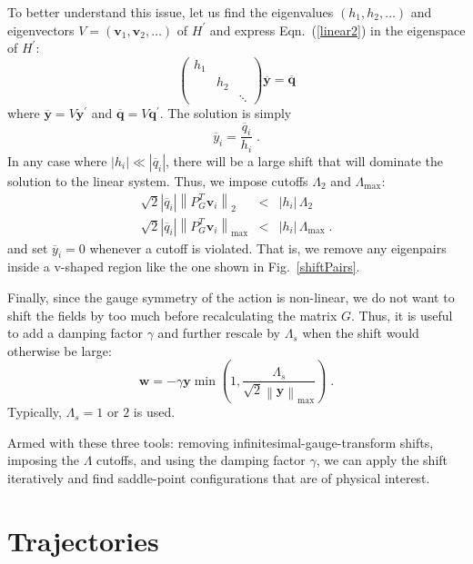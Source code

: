 \documentclass[preprint,aps,prd]{revtex4-2}
\newcommand{\be}{\begin{equation}}
\newcommand{\eq}{\end{equation}}
\newcommand{\heigen}{h}
\begin{document}
To better understand this issue, let us find the eigenvalues
$\left(\heigen_1, \heigen_2, \ldots\right)$ and
eigenvectors $V=\left(\mathbf{v}_1, \mathbf{v}_2, \ldots\right)$
of $H^\prime$ and express Eqn.~(\ref{linear2}) in the eigenspace of $H^\prime$:
\be
\begin{pmatrix}
    \heigen_1 & & \\
    & \heigen_2 & \\
    & & \ddots  \end{pmatrix} \overline{\mathbf{y}} =
  \overline{\mathbf{q}} \label{linear3}
\eq
where $\overline{\mathbf{y}} = V \mathbf{y}^\prime$ and
$\overline{\mathbf{q}}  = V \mathbf{q}^\prime$.
The solution is simply
\be
    \overline{y}_i = \frac{\overline{q}_i}{\heigen_i} \; .
\eq
In any case where $\left|\heigen_i\right|\ll
\left|\overline{q}_i\right|$,
there will be a large shift that will dominate the solution
to the linear system.
Thus, we impose cutoffs $\Lambda_2$ and $\Lambda_\mathrm{max}$:
\begin{eqnarray}
    \sqrt{2} \left|\overline{q}_i\right|\left\lVert P_G^T \mathbf{v}_i\right\rVert_2
     &<& \left|\heigen_i\right|\,\Lambda_2 \label{lambda2} \\
    \sqrt{2} \left|\overline{q}_i\right|
      \left\lVert P_G^T \mathbf{v}_i\right\rVert_\mathrm{max}
    &<& \left|\heigen_i\right|\,\Lambda_\mathrm{max} \; .
\end{eqnarray}
%
and set $\overline{y}_i=0$ whenever a cutoff is violated.
That is, we remove any eigenpairs inside a v-shaped
region like the one shown in Fig.~\ref{shiftPairs}.  

Finally, since the gauge symmetry of the action is non-linear,
we do not want to shift the fields by too much before recalculating
the matrix $G$.  
Thus, it is useful to add a damping factor $\gamma$ and
further rescale by $\Lambda_s$ when the shift would
otherwise be large:
\be
  \mathbf{w} = - \gamma \mathbf{y} \min\left(1, \frac{\Lambda_s}{
    \sqrt{2} \left\lVert \mathbf{y}\right\rVert_\mathrm{max}}\right) \; .
\eq
Typically, $\Lambda_s = 1$ or $2$ is used.

Armed with these three tools:  removing infinitesimal-gauge-transform shifts,
imposing the $\Lambda$ cutoffs, and using the damping factor $\gamma$,
we can apply the shift iteratively and find saddle-point configurations
that are of physical interest.


\section{Trajectories}
\end{document}
